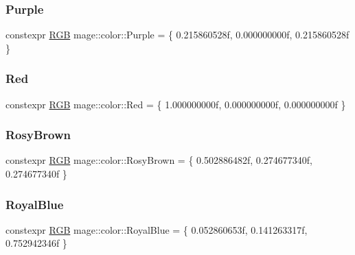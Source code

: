 \mbox{\label{namespacemage_1_1color_af70cf4f9a882428e08cb958fe75a5a30}} 
\subsubsection{\texorpdfstring{Purple}{Purple}}
{\footnotesize\ttfamily constexpr \mbox{\hyperlink{structmage_1_1_r_g_b}{R\+GB}} mage\+::color\+::\+Purple = \{ 0.\+215860528f, 0.\+000000000f, 0.\+215860528f \}}

\mbox{\label{namespacemage_1_1color_a244419fcb8dc2b947e0c50af5fa4fb52}} 
\subsubsection{\texorpdfstring{Red}{Red}}
{\footnotesize\ttfamily constexpr \mbox{\hyperlink{structmage_1_1_r_g_b}{R\+GB}} mage\+::color\+::\+Red = \{ 1.\+000000000f, 0.\+000000000f, 0.\+000000000f \}}

\mbox{\label{namespacemage_1_1color_ad16b7dcec432fa50bcc5b1436122c7d4}} 
\subsubsection{\texorpdfstring{Rosy\+Brown}{RosyBrown}}
{\footnotesize\ttfamily constexpr \mbox{\hyperlink{structmage_1_1_r_g_b}{R\+GB}} mage\+::color\+::\+Rosy\+Brown = \{ 0.\+502886482f, 0.\+274677340f, 0.\+274677340f \}}

\mbox{\label{namespacemage_1_1color_a9a5a96e06db610b817a28c688424f787}} 
\subsubsection{\texorpdfstring{Royal\+Blue}{RoyalBlue}}
{\footnotesize\ttfamily constexpr \mbox{\hyperlink{structmage_1_1_r_g_b}{R\+GB}} mage\+::color\+::\+Royal\+Blue = \{ 0.\+052860653f, 0.\+141263317f, 0.\+752942346f \}}

